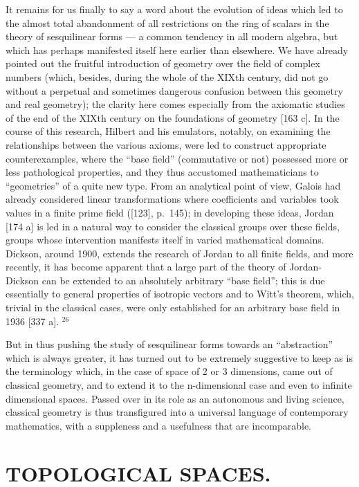 It remains for us finally to say a word about the evolution of ideas which led to the almost total abandonment of all restrictions on the ring of scalars in the theory of sesquilinear forms --- a common tendency in all modern algebra, but which has perhaps manifested itself here earlier than elsewhere. We have already pointed out the fruitful introduction of geometry over the field of complex numbers (which, besides, during the whole of the XIXth century, did not go without a perpetual and sometimes dangerous confusion between this geometry and real geometry); the clarity here comes especially from the axiomatic studies of the end of the XIXth century on the foundations of geometry {[}163 c{]}. In the course of this research, Hilbert and his emulators, notably, on examining the relationships between the various axioms, were led to construct appropriate counterexamples, where the ``base field'' (commutative or not) possessed more or less pathological properties, and they thus accustomed mathematicians to ``geometries'' of a quite new type. From an analytical point of view, Galois had already considered linear transformations where coefficients and variables took values in a finite prime field ({[}123{]}, p.~145); in developing these ideas, Jordan {[}174 a{]} is led in a natural way to consider the classical groups over these fields, groups whose intervention manifests itself in varied mathematical domains. Dickson, around 1900, extends the research of Jordan to all finite fields, and more recently, it has become apparent that a large part of the theory of Jordan-Dickson can be extended to an absolutely arbitrary ``base field''; this is due essentially to general properties of isotropic vectors and to Witt's theorem, which, trivial in the classical cases, were only established for an arbitrary base field in 1936 {[}337 a{]}. \(^{26}\)

But in thus pushing the study of sesquilinear forms towards an ``abstraction'' which is always greater, it has turned out to be extremely suggestive to keep as is the terminology which, in the case of space of 2 or 3 dimensions, came out of classical geometry, and to extend it to the n-dimensional case and even to infinite dimensional spaces. Passed over in its role as an autonomous and living science, classical geometry is thus transfigured into a universal language of contemporary mathematics, with a suppleness and a usefulness that are incomparable.

\chapter{TOPOLOGICAL SPACES.}

